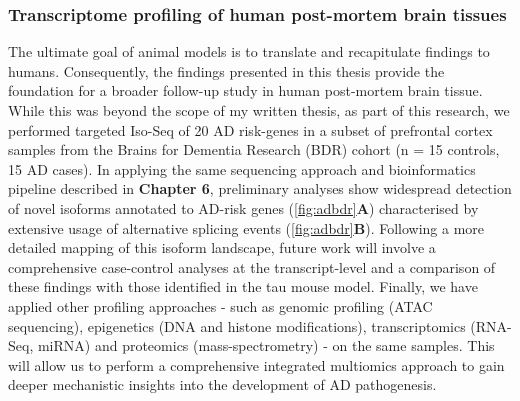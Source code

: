 \subsubsection{Transcriptome profiling of human post-mortem brain tissues}  
The ultimate goal of animal models is to translate and recapitulate findings to humans. Consequently, the findings presented in this thesis provide the foundation for a broader follow-up study in human post-mortem brain tissue. While this was beyond the scope of my written thesis, as part of this research, we performed targeted Iso-Seq of 20 AD risk-genes in a subset of prefrontal cortex samples from the Brains for Dementia Research (BDR) cohort (n = 15 controls, 15 AD cases). In applying the same sequencing approach and bioinformatics pipeline described in \textbf{Chapter 6}, preliminary analyses show widespread detection of novel isoforms annotated to AD-risk genes (\cref{fig:adbdr}\textbf{A}) characterised by extensive usage of alternative splicing events (\cref{fig:adbdr}\textbf{B}). Following a more detailed mapping of this isoform landscape, future work will involve a comprehensive case-control analyses at the transcript-level and a comparison of these findings with those identified in the tau mouse model. Finally, we have applied other profiling approaches - such as genomic profiling (ATAC sequencing), epigenetics (DNA and histone modifications), transcriptomics (RNA-Seq, miRNA) and proteomics (mass-spectrometry) - on the same samples. This will allow us to perform a comprehensive integrated multiomics approach to gain deeper mechanistic insights into the development of AD pathogenesis.     

